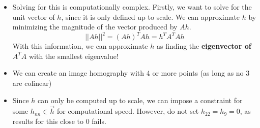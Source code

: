 \documentclass{article}
\begin{document}
\begin{itemize}
    \item Solving for this is computationally complex. Firstly, we want to solve for the unit vector of $h$, since it is only defined up to scale. We can approximate $h$ by minimizing the magnitude of the vector produced by $Ah$.
    $$||Ah||^2 = (Ah)^TAh = h^TA^TAh$$
    With this information, we can approximate $h$ as finding the \textbf{eigenvector of} $A^TA$ with the smallest eigenvalue!
    \item We can create an image homography with 4 or more points (as long as no 3 are colinear)
    \item Since $h$ can only be computed up to scale, we can impose a constraint for some $h_{nn} \in \vec{h}$ for computational speed. However, do not set $h_{22} = h_9 = 0$, as results for this close to 0 fails.
\end{itemize}
\end{document}
